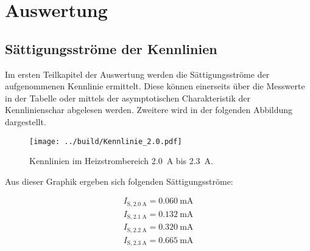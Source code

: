 



\section{Auswertung}
\label{sec:Auswertung}

\subsection{Sättigungsströme der Kennlinien}
\label{sec:Saettigungsstrom}

Im ersten Teilkapitel der Auswertung werden die Sättigungsströme der aufgenommenen Kennlinie ermittelt. Diese können einerseits über die Messwerte in der Tabelle 
oder mittels der asymptotischen Charakteristik der Kennlinienschar abgelesen werden. Zweitere wird in der folgenden Abbildung dargestellt.

\begin{figure}
    \centering
    \texttt{[image: ../build/Kennlinie\_2.0.pdf]}
    \caption{Kennlinien im Heizstrombereich \qty{2.0}{\ampere} bis \qty{2.3}{\ampere}.}
    \label{fig:Kennlinien1}
\end{figure}

Aus dieser Graphik ergeben sich folgenden Sättigungsströme:

\begin{align*}
    I_{\text{S},\qty{2.0}{\ampere}} = \qty{0.060}{\milli\ampere}\\
    I_{\text{S},\qty{2.1}{\ampere}} = \qty{0.132}{\milli\ampere}\\   
    I_{\text{S},\qty{2.2}{\ampere}} = \qty{0.320}{\milli\ampere}\\   
    I_{\text{S},\qty{2.3}{\ampere}} = \qty{0.665}{\milli\ampere}
\end{align*}

\noindent 

